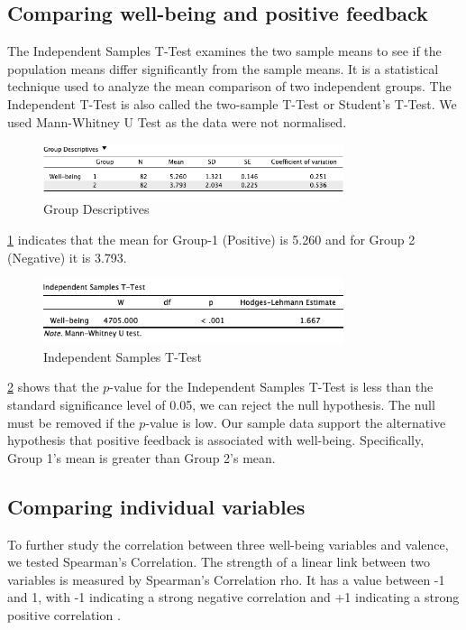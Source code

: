 \documentclass[conference]{IEEEtran}
\begin{document}
		\subsection[htbp]{Comparing well-being and positive feedback}
		The Independent Samples T-Test examines the two sample means to see if the population means differ significantly from the sample means. It is a statistical technique used to analyze the mean comparison of two independent groups. The Independent T-Test is also called the two-sample T-Test or Student’s T-Test. 
		We used Mann-Whitney U Test as the data were not normalised.\\
		
		\begin{figure}[htbp]
		\centerline{\includegraphics[width=88mm,scale=1]{Group Descriptives.png}}
		\caption{Group Descriptives}
		\label{Group Descriptives}
		\end{figure}
	
		\figurename{\ref{Group Descriptives}} indicates that the mean for Group-1 (Positive) is 5.260 and for Group 2 (Negative) it is 3.793.\\
		
		\begin{figure}[htbp]
		\centerline{\includegraphics[width=88mm,scale=1]{Independent Samples T-Test.png}}
		\caption{Independent Samples T-Test}
		\label{Independent Samples T-Test}
		\end{figure}
	
		\figurename{\ref{Independent Samples T-Test}} shows that the $p$-value for the Independent Samples T-Test is less than the standard significance level of 0.05, we can reject the null hypothesis. The null must be removed if the $p$-value is low. Our sample data support the alternative hypothesis that positive feedback is associated with well-being. Specifically, Group 1’s mean is greater than Group 2’s mean.
	
		\subsection[H]{Comparing individual variables}
		To further study the correlation between three well-being variables and valence, we tested Spearman's Correlation. The strength of a linear link between two variables is measured by Spearman's Correlation rho. It has a value between -1 and 1, with -1 indicating a strong negative correlation and +1 indicating a strong positive correlation \cite{b18}.\\
		
\end{document}
